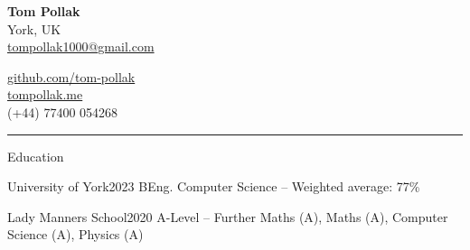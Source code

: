 \documentclass{structure}
\begin{document}
\parbox{0.5\textwidth}{
    {\namesize\bf{Tom Pollak}} \\[6pt]
    York, UK\\
    \href{mailto:tompollak1000@gmail.com}{tompollak1000@gmail.com}
}
\hfill
\parbox{0.5\textwidth}{
    \vspace*{10pt}

    \begin{flushright}

        \href{https://github.com/tom-pollak}{github.com/tom-pollak} \\
        \href{https://tompollak.me}{tompollak.me} \\
        (+44) 77400 054268
    \end{flushright}

}

\smallskip
\hrule
\smallskip


\begin{rSection}{Education}

    \begin{rSubsectionNoList}{University of York}{2023}{
            BEng. Computer Science -- Weighted average: 77\%
        }{}{}
    \end{rSubsectionNoList}

    \begin{rSubsectionNoList}{Lady Manners School}{2020}{
            A-Level --  Further Maths (A), Maths (A), Computer Science (A), Physics (A)
        }{}{}
    \end{rSubsectionNoList}

\end{rSection}

\end{document}
